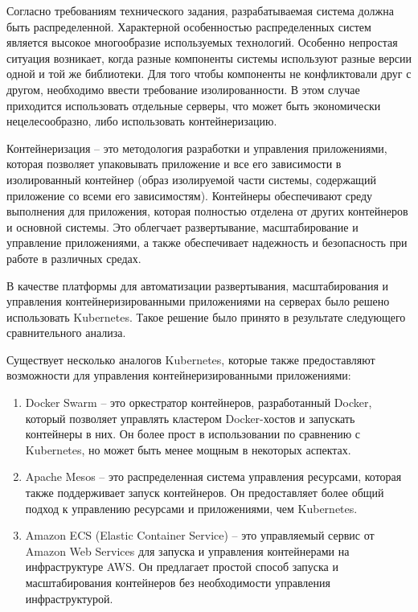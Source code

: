 Согласно требованиям технического задания, разрабатываемая система должна быть распределенной. Характерной особенностью распределенных систем является высокое многообразие используемых технологий. Особенно непростая ситуация возникает, когда разные компоненты системы используют разные версии одной и той же библиотеки. Для того чтобы компоненты не конфликтовали друг с другом, необходимо ввести требование изолированности. В этом случае приходится использовать отдельные серверы, что может быть экономически нецелесообразно, либо использовать контейнеризацию. 

Контейнеризация -- это методология разработки и управления приложениями, которая позволяет упаковывать приложение и все его зависимости в изолированный контейнер (образ изолируемой части системы, содержащий приложение со всеми его зависимостям). Контейнеры обеспечивают среду выполнения для приложения, которая полностью отделена от других контейнеров и основной системы. Это облегчает развертывание, масштабирование и управление приложениями, а также обеспечивает надежность и безопасность при работе в различных средах. 

В качестве платформы для автоматизации развертывания, масштабирования и управления контейнеризированными приложениями на серверах было решено использовать Kubernetes. Такое решение было принято в результате следующего сравнительного анализа.

Существует несколько аналогов Kubernetes, которые также предоставляют возможности для управления контейнеризированными приложениями:
\begin{enumerate}
    \item Docker Swarm -- это оркестратор контейнеров, разработанный Docker, который позволяет управлять кластером Docker-хостов и запускать контейнеры в них. Он более прост в использовании по сравнению с Kubernetes, но может быть менее мощным в некоторых аспектах.
    \item Apache Mesos -- это распределенная система управления ресурсами, которая также поддерживает запуск контейнеров. Он предоставляет более общий подход к управлению ресурсами и приложениями, чем Kubernetes.
    \item Amazon ECS (Elastic Container Service) -- это управляемый сервис от Amazon Web Services для запуска и управления контейнерами на инфраструктуре AWS. Он предлагает простой способ запуска и масштабирования контейнеров без необходимости управления инфраструктурой.
\end{enumerate}

